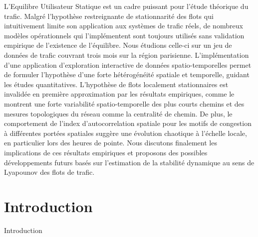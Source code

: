 {L'Equilibre Utilisateur Statique est un cadre puissant pour l'étude théorique du trafic. Malgré l'hypothèse restreignante de stationnarité des flots qui intuitivement limite son application aux systèmes de trafic réels, de nombreux modèles opérationnels qui l'implémentent sont toujours utilisés sans validation empirique de l'existence de l'équilibre. Nous étudions celle-ci sur un jeu de données de trafic couvrant trois mois sur la région parisienne. L'implémentation d'une application d'exploration interactive de données spatio-temporelles permet de formuler l'hypothèse d'une forte hétérogénéité spatiale et temporelle, guidant les études quantitatives. L'hypothèse de flots localement stationnaires est invalidée en première approximation par les résultats empiriques, comme le montrent une forte variabilité spatio-temporelle des plus courts chemins et des mesures topologiques du réseau comme la centralité de chemin. De plus, le comportement de l'index d'autocorrelation spatiale pour les motifs de congestion à différentes portées spatiales suggère une évolution chaotique à l'échelle locale, en particulier lors des heures de pointe. Nous discutons finalement les implications de ces résultats empiriques et proposons des possibles développements futurs basés sur l'estimation de la stabilité dynamique au sens de Lyapounov des flots de trafic.
}


\section{Introduction}{Introduction}
\label{treq:introduction}


